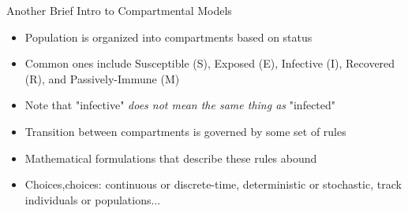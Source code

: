 \documentclass{beamer}
\begin{document}
\begin{frame}{Another Brief Intro to Compartmental Models}
    \begin{itemize}
        \item Population is organized into compartments based on status
        \item Common ones include Susceptible (S), Exposed (E), Infective (I), Recovered (R), and Passively-Immune (M)
        \item Note that "infective" \textit{does not mean the same thing as} "infected"
        \item Transition between compartments is governed by some set of rules
        \item Mathematical formulations that describe these rules abound
        \item Choices,choices: continuous or discrete-time, deterministic or stochastic, track individuals or populations...
    \end{itemize}
\end{frame}
\end{document}
